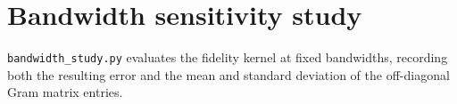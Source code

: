 



\section{Bandwidth sensitivity study}

\texttt{bandwidth\_study.py} evaluates the fidelity kernel at fixed bandwidths,
recording both the resulting error and the mean and standard deviation of the
off-diagonal Gram matrix entries.


